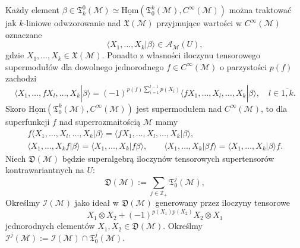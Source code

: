 \documentclass[11pt,a4paper]{report}
\theoremstyle{definition}
\begin{document}
Każdy element $\beta \in \mathfrak{T}^0_k(\mathcal{M}) \simeq \underline{\mathrm{Hom}} (\mathfrak T^k_0(\mathcal{M}), C^\infty(\mathcal{M}))$ można traktować jak $k$-liniowe odwzorowanie nad $\mathfrak{X} (\mathcal{M})$ przyjmujące wartości w $C^\infty(\mathcal{M})$ oznaczane
\begin{equation*}
	\langle X_1,\ldots, X_k|\beta\rangle \in \mathcal{A_M}(U),
\end{equation*}
gdzie $X_1, \ldots, X_k \in \mathfrak{X} (\mathcal{M})$. Ponadto z własności iloczynu tensorowego supermodułów dla dowolnego jednorodnego $f \in C^\infty(\mathcal{M})$ o parzystości $p(f)$ zachodzi
\begin{equation*}
	\langle X_1,\ldots, fX_l,\ldots,X_k|\beta \rangle =(-1)^{p(f)\sum_{i=1}^{l-1}p(X_i)}\langle f X_1,\ldots,X_l,\ldots,X_k|\beta\rangle, \quad l \in \overline{1,k}.
\end{equation*}
Skoro $\underline{\mathrm{Hom}} (\mathfrak T^k_0(\mathcal{M}), C^\infty(\mathcal{M}))$ jest supermodułem nad $C^\infty(\mathcal{M})$, to dla superfunkcji $f$ nad superrozmaitością $\mathcal{M}$ mamy
\begin{equation*}
	\begin{gathered}
		f \langle X_1,\ldots,X_l,\ldots,X_k|\beta\rangle = \langle f X_1,\ldots,X_l,\ldots,X_k|\beta\rangle, \\
		\langle X_1,\ldots,X_k f|\beta\rangle = \langle X_1,\ldots,X_k |f \beta\rangle, \qquad 
		\langle X_1,\ldots,X_k|\beta f\rangle = \langle X_1,\ldots,X_k|\beta\rangle f.
	\end{gathered}
\end{equation*}
Niech $\mathfrak{D}(\mathcal{M})$ będzie superalgebrą iloczynów tensorowych supertensorów kontrawariantnych na $U$:
\begin{equation*}
	\mathfrak{D}(\mathcal{M}) := \sum_{j \in \mathbb{Z}_+} \mathfrak T^j_0(\mathcal{M}),
\end{equation*}
Określmy $\mathcal{I(M)}$ jako ideał w $\mathfrak{D}(\mathcal{M})$ generowany przez iloczyny tensorowe
\begin{equation*}
	X_1 \otimes X_2 + (-1)^{p(X_1)p(X_2)} X_2 \otimes X_1
\end{equation*}
jednorodnych elementów $X_1, X_2 \in \mathfrak{D}(\mathcal{M})$.
Określmy $\mathcal{I}^j\mathcal{(M)}:=\mathcal{I(M)} \cap \mathfrak T^j_0 \mathcal{(M)}$.
		      			
\end{document}
